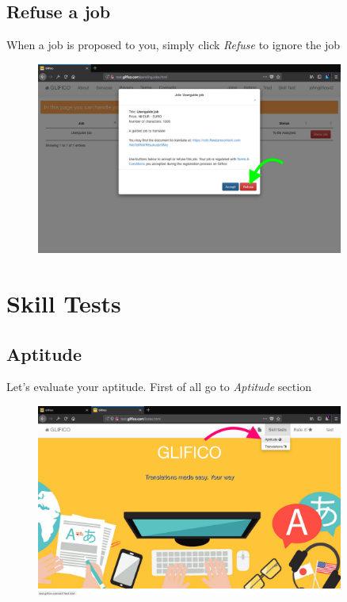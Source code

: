 \documentclass[11 pt, a4paper]{article}
\begin{document}
\clearpage
\subsection{Refuse a job}
When a job is proposed to you, simply click \textit{Refuse} to ignore the job
\begin{figure}[H]
\centering
\includegraphics[width=0.9\textwidth]{translator_job3_del.png}
\end{figure}


\clearpage
\section{Skill Tests}
\subsection{Aptitude}
Let's evaluate your aptitude. First of all go to \textit{Aptitude} section
\begin{figure}[H]
\centering
\includegraphics[width=0.9\textwidth]{translator_skilltest0.png}
\end{figure}
\end{document}
